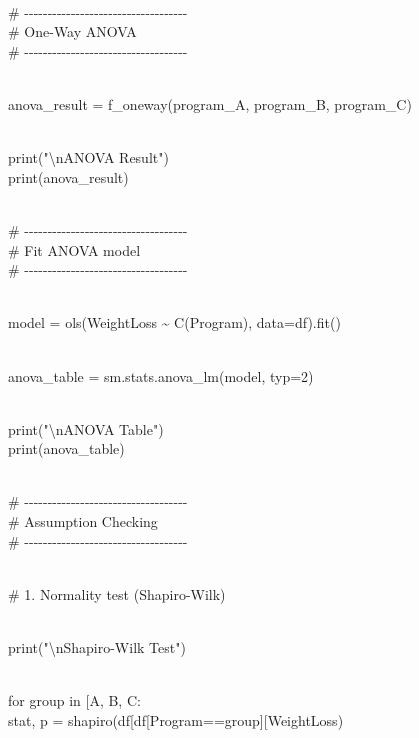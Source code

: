 \documentclass[
]{article}
\begin{document}
\strut \\
\#
-\/-\/-\/-\/-\/-\/-\/-\/-\/-\/-\/-\/-\/-\/-\/-\/-\/-\/-\/-\/-\/-\/-\/-\/-\/-\/-\/-\/-\/-\/-\/-\/-\/-\/-\\
\# One-Way ANOVA\\
\#
-\/-\/-\/-\/-\/-\/-\/-\/-\/-\/-\/-\/-\/-\/-\/-\/-\/-\/-\/-\/-\/-\/-\/-\/-\/-\/-\/-\/-\/-\/-\/-\/-\/-\/-\\
\strut \\
anova\_result = f\_oneway(program\_A, program\_B, program\_C)\\
\strut \\
print("\textbackslash nANOVA Result")\\
print(anova\_result)\\
\strut \\
\#
-\/-\/-\/-\/-\/-\/-\/-\/-\/-\/-\/-\/-\/-\/-\/-\/-\/-\/-\/-\/-\/-\/-\/-\/-\/-\/-\/-\/-\/-\/-\/-\/-\/-\/-\\
\# Fit ANOVA model\\
\#
-\/-\/-\/-\/-\/-\/-\/-\/-\/-\/-\/-\/-\/-\/-\/-\/-\/-\/-\/-\/-\/-\/-\/-\/-\/-\/-\/-\/-\/-\/-\/-\/-\/-\/-\\
\strut \\
model = ols(\textquotesingle WeightLoss \textasciitilde{}
C(Program)\textquotesingle, data=df).fit()\\
\strut \\
anova\_table = sm.stats.anova\_lm(model, typ=2)\\
\strut \\
print("\textbackslash nANOVA Table")\\
print(anova\_table)\\
\strut \\
\#
-\/-\/-\/-\/-\/-\/-\/-\/-\/-\/-\/-\/-\/-\/-\/-\/-\/-\/-\/-\/-\/-\/-\/-\/-\/-\/-\/-\/-\/-\/-\/-\/-\/-\/-\\
\# Assumption Checking\\
\#
-\/-\/-\/-\/-\/-\/-\/-\/-\/-\/-\/-\/-\/-\/-\/-\/-\/-\/-\/-\/-\/-\/-\/-\/-\/-\/-\/-\/-\/-\/-\/-\/-\/-\/-\\
\strut \\
\# 1. Normality test (Shapiro-Wilk)\\
\strut \\
print("\textbackslash nShapiro-Wilk Test")\\
\strut \\
for group in {[}\textquotesingle A\textquotesingle,
\textquotesingle B\textquotesingle,
\textquotesingle C\textquotesingle{]}:\\
stat, p =
shapiro(df{[}df{[}\textquotesingle Program\textquotesingle{]}==group{]}{[}\textquotesingle WeightLoss\textquotesingle{]})\\
\end{document}
